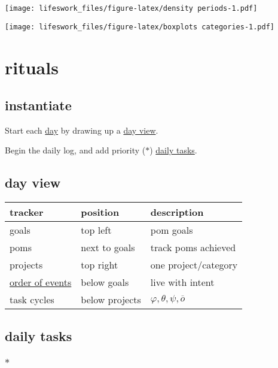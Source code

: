\documentclass[]{book}
\begin{document}
\texttt{[image: lifeswork\_files/figure-latex/density periods-1.pdf]}

\texttt{[image: lifeswork\_files/figure-latex/boxplots categories-1.pdf]}

\hypertarget{rituals}{%
\chapter{rituals}\label{rituals}}

\hypertarget{instantiate}{%
\section{instantiate}\label{instantiate}}

Start each \href{https://study.com/academy/lesson/german-days-of-the-week.html}{day} by drawing up a \protect\hyperlink{day-view}{day view}.

Begin the daily log, and add priority (\(*\)) \protect\hyperlink{daily-tasks}{daily tasks}.

\hypertarget{day-view}{%
\section{day view}\label{day-view}}

\begin{longtable}[]{@{}lll@{}}
\toprule
tracker & position & description\tabularnewline
\midrule
\endhead
goals & top left & pom goals\tabularnewline
poms & next to goals & track poms achieved\tabularnewline
projects & top right & one project/category\tabularnewline
\protect\hyperlink{order-of-events}{order of events} & below goals & live with intent\tabularnewline
task cycles & below projects & \(\varphi, \theta, \psi, \overline o\)\tabularnewline
\bottomrule
\end{longtable}

\hypertarget{daily-tasks}{%
\section{daily tasks}\label{daily-tasks}}

\hypertarget{section}{%
\subsection{\texorpdfstring{\(*\)}{*}}\label{section}}
\end{document}
